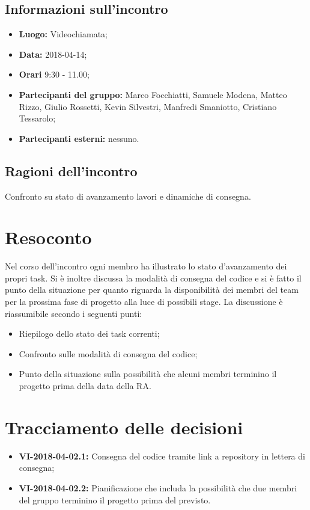 \documentclass[openany,12pt,a4paper]{article}
\begin{document}
  \subsection{Informazioni sull'incontro} 
   
  \begin{itemize}  
      \item \textbf{Luogo:} Videochiamata;
      \item \textbf{Data:} 2018-04-14; 
      \item \textbf{Orari} 9:30 - 11.00;
      \item \textbf{Partecipanti del gruppo:} Marco Focchiatti, Samuele Modena, Matteo Rizzo, Giulio Rossetti, Kevin Silvestri, Manfredi Smaniotto, Cristiano Tessarolo; 
      \item \textbf{Partecipanti esterni:} nessuno. 
  \end{itemize} 
 
  \subsection{Ragioni dell'incontro} 
  Confronto su stato di avanzamento lavori e dinamiche di consegna.
 
  \section{Resoconto} 
  Nel corso dell'incontro ogni membro ha illustrato lo stato d'avanzamento dei propri task. Si è inoltre discussa la modalità di consegna del codice e si è fatto il punto della situazione per quanto riguarda la disponibilità dei membri del team per la prossima fase di progetto alla luce di possibili stage. La discussione è riassumibile secondo i seguenti punti:   
	
  \begin{itemize}
	\item Riepilogo dello stato dei task correnti;
	\item Confronto sulle modalità di consegna del codice;
	\item Punto della situazione sulla possibilità che alcuni membri terminino il progetto prima della data della RA.
  \end{itemize}

  \section{Tracciamento delle decisioni} 
   
  \begin{itemize} 
      \item \textbf{VI-2018-04-02.1:} Consegna del codice tramite link a repository in lettera di consegna;
      \item \textbf{VI-2018-04-02.2:} Pianificazione che includa la possibilità che due membri del gruppo terminino il progetto prima del previsto.
  \end{itemize} 
   
  
\end{document}
